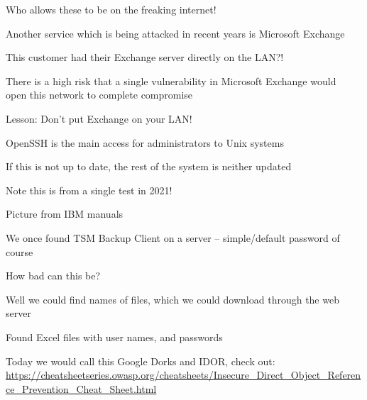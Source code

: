 \documentclass[Screen16to9,17pt]{foils}
\begin{document}
\begin{list2}
\item Who allows these to be on the freaking internet!
\end{list2}




Another service which is being attacked in recent years is Microsoft Exchange

This customer had their Exchange server directly on the LAN?!

\begin{list2}
\item There is a high risk that a single vulnerability in Microsoft Exchange would \\
open this network to complete compromise
\end{list2}




\begin{list2}
\item Lesson: Don't put Exchange on your LAN!
\end{list2}




\begin{list2}
\item OpenSSH is the main access for administrators to Unix systems
\item If this is not up to date, the rest of the system is neither updated
\item Note this is from a single test in 2021!
\end{list2}



Picture from IBM manuals

\begin{list2}
\item We once found TSM Backup Client on a server -- simple/default password of course
\item How bad can this be?
\item Well we could find names of files, which we could download through the web server
\item Found Excel files with user names, and passwords
\item Today we would call this Google Dorks and IDOR, check out:\\ {\footnotesize
\url{https://cheatsheetseries.owasp.org/cheatsheets/Insecure_Direct_Object_Reference_Prevention_Cheat_Sheet.html}}
\end{list2}
\end{document}
